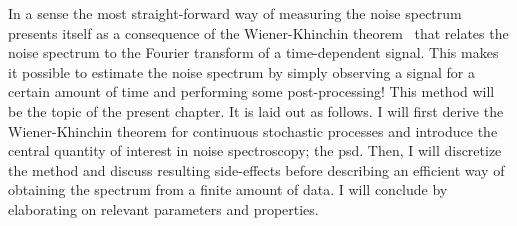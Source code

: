 In a sense the most straight-forward way of measuring the noise spectrum presents itself as a consequence of the Wiener-Khinchin theorem~\cite{Wiener1930,Khintchine1934} that relates the noise spectrum to the Fourier transform of a time-dependent signal.
This makes it possible to estimate the noise spectrum by simply observing a signal for a certain amount of time and performing some post-processing!
This method will be the topic of the present chapter.
It is laid out as follows.
I will first derive the Wiener-Khinchin theorem for continuous stochastic processes and introduce the central quantity of interest in noise spectroscopy; the \gls{psd}.
Then, I will discretize the method and discuss resulting side-effects before describing an efficient way of obtaining the spectrum from a finite amount of data.
I will conclude by elaborating on relevant parameters and properties.

